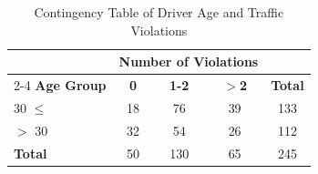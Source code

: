 \begin{table}[H]
\centering
\caption{Contingency Table of Driver Age and Traffic Violations}
\label{tab:table1}
\begin{tabular}{@{}l|ccc|c@{}}
\toprule
 & \multicolumn{3}{c|}{\textbf{Number of Violations}} & \\
\cmidrule{2-4}
\textbf{Age Group} & \textbf{0} & \textbf{1-2} & \textbf{$>$2} & \textbf{Total} \\ 
\midrule
30 $\le$ & 18 & 76 & 39 & 133 \\
$>$ 30 & 32 & 54 & 26 & 112 \\
\midrule
\textbf{Total} & 50 & 130 & 65 & 245 \\ 
\bottomrule
\end{tabular}
\end{table}